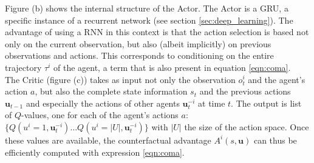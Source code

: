 Figure (b) shows the internal structure of the Actor. The Actor is a GRU, a specific instance of a recurrent network (see section \ref{sec:deep_learning}). The advantage of using a RNN in this context is that the action selection is based not only on the current observation, but also (albeit implicitly) on previous observations and actions. This corresponds to conditioning on the entire trajectory $\tau^i$ of the agent, a term that is also present in equation \ref{eqn:coma}.\\

The Critic (figure (c)) takes as input not only the observation $o_t^i$ and the agent's action $a$, but also the complete state information $s_t$ and the previous actions $\bm{u}_{t-1}$ and especially the actions of other agents $\bm{u}_t^{-i}$ at time $t$. The output is list of $Q$-values, one for each of the agent's actions $a$: $\{Q(u^i=1, \bm{u}_t^{-i}) \ldots  Q(u^i=|U|, \bm{u}_t^{-i}) \}$ with $|U|$ the size of the action space. Once these values are available, the counterfactual advantage $A^i(s, \bm{u})$ can thus be efficiently computed with expression \ref{eqn:coma}.

